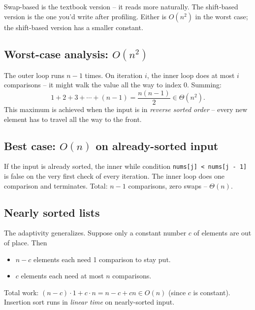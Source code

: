 \documentclass[11pt]{article}
\begin{document}
\begin{notebox}
Swap-based is the textbook version -- it reads more naturally. The
shift-based version is the one you'd write after profiling. Either
is $O(n^2)$ in the worst case; the shift-based version has a smaller
constant.
\end{notebox}

\subsection{Worst-case analysis: $O(n^2)$}

\begin{ideabox}
The outer loop runs $n - 1$ times. On iteration $i$, the inner loop
does at most $i$ comparisons -- it might walk the value all the way
to index $0$. Summing:
\[
  1 + 2 + 3 + \cdots + (n - 1) = \frac{n(n - 1)}{2} \in \Theta(n^2).
\]
This maximum is achieved when the input is in \emph{reverse sorted
order} -- every new element has to travel all the way to the front.
\end{ideabox}

\subsection{Best case: $O(n)$ on already-sorted input}

\begin{ideabox}
If the input is already sorted, the inner while condition
\texttt{nums[j]\,<\,nums[j - 1]} is false on the very first check of
every iteration. The inner loop does one comparison and terminates.
Total: $n - 1$ comparisons, zero swaps -- $\Theta(n)$.
\end{ideabox}

\subsection*{Nearly sorted lists}

The adaptivity generalizes. Suppose only a constant number $c$ of
elements are out of place. Then
\begin{itemize}[leftmargin=*]
  \item $n - c$ elements each need 1 comparison to stay put.
  \item $c$ elements each need at most $n$ comparisons.
\end{itemize}
Total work: $(n - c) \cdot 1 + c \cdot n = n - c + cn \in O(n)$ (since
$c$ is constant). Insertion sort runs in \emph{linear time} on
nearly-sorted input.
\end{document}
